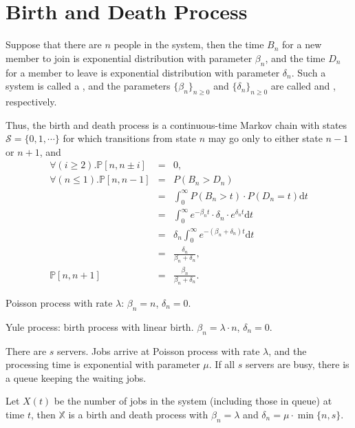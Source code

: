 \section{Birth and Death Process}

\begin{definition}
Suppose that there are $ n $ people in the system, then the time $ B_{n} $ for a new member to join is exponential distribution with parameter $ \beta_{n} $, and the time $ D_{n} $ for a member to leave is exponential distribution with parameter $ \delta_{n} $. Such a system is called a , and the parameters $ \{ \beta_{n} \}_{n \ge 0} $ and $ \{ \delta_{n} \}_{n \ge 0} $ are called  and , respectively.

Thus, the birth and death process is a continuous-time Markov chain with states $ \mathcal{S} = \{ 0, 1, \cdots \} $ for which transitions from state $ n $ may go only to either state $ n - 1 $ or $ n + 1 $, and
\begin{eqnarray*}
\forall(i \ge 2). \mathbb{P}[n, n \pm i] & = & 0, \\
\forall(n \le 1). \mathbb{P}[n, n - 1]
    & = & P(B_{n} > D_{n}) \\
    & = & \int_{0}^{\infty} P(B_{n} > t) \cdot P(D_{n} = t) \mathrm{d}t \\
    & = & \int_{0}^{\infty} e^{-\beta_{n}t} \cdot \delta_{n} \cdot e^{\delta_{n}t} \mathrm{d}t \\
    & = & \delta_{n} \int_{0}^{\infty} e^{-(\beta_{n} + \delta_{n})t} \mathrm{d}t \\
    & = & \frac{\delta_{n}}{\beta_{n} + \delta_{n}}, \\
\mathbb{P}[n, n + 1] & = & \frac{\beta_{n}}{\beta_{n} + \delta_{n}}.
\end{eqnarray*}
\end{definition}

\begin{example}
Poisson process with rate $ \lambda $: $ \beta_{n} = n $, $ \delta_{n} = 0 $.
\end{example}

\begin{example}
Yule process: birth process with linear birth. $ \beta_{n} = \lambda \cdot n $, $ \delta_{n} = 0 $.
\end{example}

\begin{example}
There are $ s $ servers. Jobs arrive at Poisson process with rate $ \lambda $, and the processing time is exponential with parameter $ \mu $. If all $ s $ servers are busy, there is a queue keeping the waiting jobs.

Let $ X(t) $ be the number of jobs in the system (including those in queue) at time $ t $, then $ \mathbb{X} $ is a birth and death process with $ \beta_{n} = \lambda $ and $ \delta_{n} = \mu \cdot \min \{n, s\} $.
\end{example}

